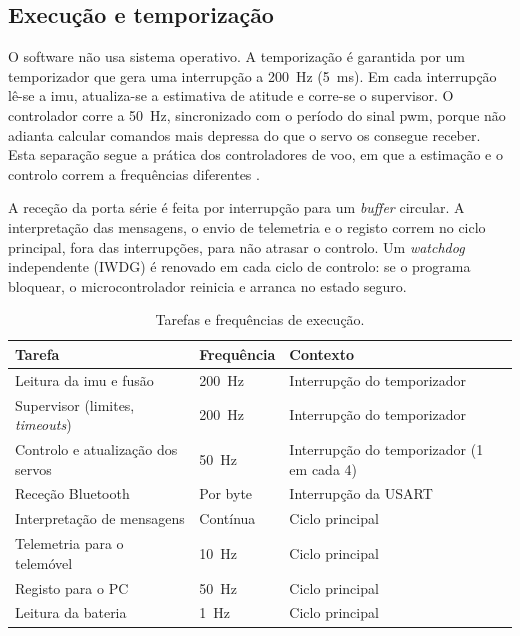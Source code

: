 \subsection{Execução e temporização}
O software não usa sistema operativo. A temporização é garantida por um temporizador que gera uma interrupção a \SI{200}{\hertz} (\SI{5}{\milli\second}). Em cada interrupção lê-se a \gls{imu}, atualiza-se a estimativa de atitude e corre-se o supervisor. O controlador corre a \SI{50}{\hertz}, sincronizado com o período do sinal \gls{pwm}, porque não adianta calcular comandos mais depressa do que o servo os consegue receber. Esta separação segue a prática dos controladores de voo, em que a estimação e o controlo correm a frequências diferentes \cite{px4ctrl,ardupilotatt}.

A receção da porta série é feita por interrupção para um \textit{buffer} circular. A interpretação das mensagens, o envio de telemetria e o registo correm no ciclo principal, fora das interrupções, para não atrasar o controlo. Um \textit{watchdog} independente (IWDG) é renovado em cada ciclo de controlo: se o programa bloquear, o microcontrolador reinicia e arranca no estado seguro.

\begin{table}[H]
\centering\small
\caption{Tarefas e frequências de execução.}
\begin{tabularx}{\textwidth}{>{\raggedright\arraybackslash}p{4cm}p{2.2cm}Y}
\toprule
Tarefa & Frequência & Contexto\\\midrule
Leitura da \acrshort{imu} e fusão & \SI{200}{\hertz} & Interrupção do temporizador\\
Supervisor (limites, \textit{timeouts}) & \SI{200}{\hertz} & Interrupção do temporizador\\
Controlo e atualização dos servos & \SI{50}{\hertz} & Interrupção do temporizador (1 em cada 4)\\
Receção Bluetooth & Por byte & Interrupção da USART\\
Interpretação de mensagens & Contínua & Ciclo principal\\
Telemetria para o telemóvel & \SI{10}{\hertz} & Ciclo principal\\
Registo para o PC & \SI{50}{\hertz} & Ciclo principal\\
Leitura da bateria & \SI{1}{\hertz} & Ciclo principal\\
\bottomrule
\end{tabularx}
\label{tab:tarefas}
\end{table}

